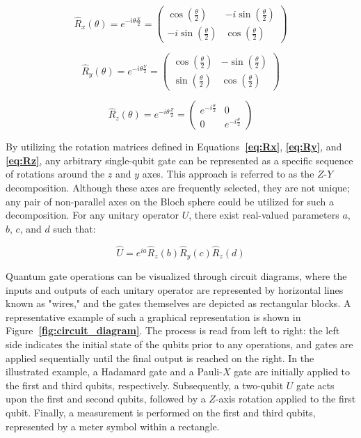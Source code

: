 \documentclass[en]{dimscthesis}
\begin{document}
\begin{equation}
	\hat{R}_{x}(\theta) = e^{-i\theta\frac{X}{2}}	
	= \begin{pmatrix} 
		\cos(\frac{\theta}{2}) & -i\sin(\frac{\theta}{2}) \\ 
		-i\sin(\frac{\theta}{2}) & 	\cos(\frac{\theta}{2}) 
	\end{pmatrix} 
	\label{eq:Rx}
\end{equation}

\begin{equation}
	\hat{R}_{y}(\theta) = e^{-i\theta\frac{Y}{2}}	
	= \begin{pmatrix} 
		\cos(\frac{\theta}{2}) & -\sin(\frac{\theta}{2}) \\ 
		\sin(\frac{\theta}{2}) & 	\cos(\frac{\theta}{2}) 
	\end{pmatrix} 
	\label{eq:Ry}
\end{equation}

\begin{equation}
	\hat{R}_{z}(\theta) = e^{-i\theta\frac{Z}{2}}	
	= \begin{pmatrix} 
		e^{-i\frac{\theta}{2} } & 0 \\ 
		0 & 	e^{-i\frac{\theta}{2} } 
	\end{pmatrix} 
	\label{eq:Rz}
\end{equation}

By utilizing the rotation matrices defined in Equations\textbf{~\ref{eq:Rx}}, \textbf{\ref{eq:Ry}}, and \textbf{\ref{eq:Rz}}, any arbitrary single-qubit gate can be represented as a specific sequence of rotations around the $z$ and $y$ axes. This approach is referred to as the $Z$-$Y$ decomposition. Although these axes are frequently selected, they are not unique; any pair of non-parallel axes on the Bloch sphere could be utilized for such a decomposition. For any unitary operator $U$, there exist real-valued parameters $a$, $b$, $c$, and $d$ such that:

\begin{equation}
	\hat{U} =e^{ia}\hat{R}_{z}(b)\hat{R}_{y}(c)\hat{R}_{z}(d) 
	\label{eq:gate_decomp}
\end{equation}

Quantum gate operations can be visualized through circuit diagrams, where the inputs and outputs of each unitary operator are represented by horizontal lines known as "wires," and the gates themselves are depicted as rectangular blocks. A representative example of such a graphical representation is shown in Figure\textbf{~\ref{fig:circuit_diagram}}. The process is read from left to right: the left side indicates the initial state of the qubits prior to any operations, and gates are applied sequentially until the final output is reached on the right. In the illustrated example, a Hadamard gate and a Pauli-$X$ gate are initially applied to the first and third qubits, respectively. Subsequently, a two-qubit $U$ gate acts upon the first and second qubits, followed by a $Z$-axis rotation applied to the first qubit. Finally, a measurement is performed on the first and third qubits, represented by a meter symbol within a rectangle.
\end{document}
